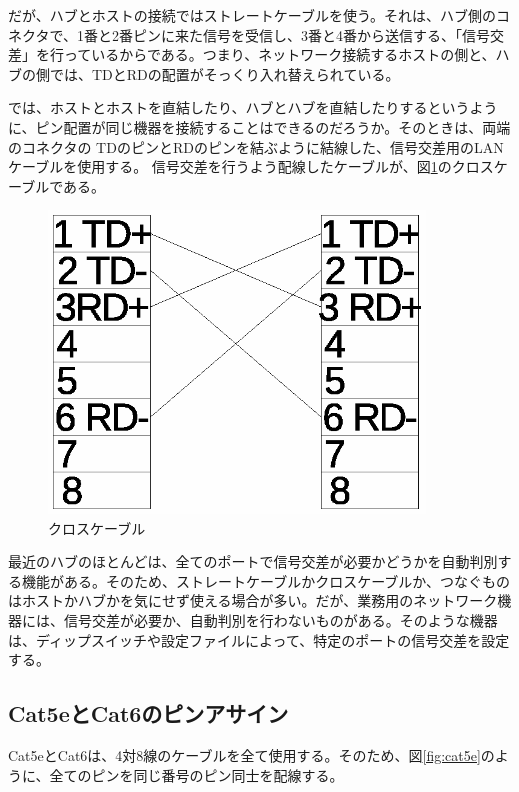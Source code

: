 だが、ハブとホストの接続ではストレートケーブルを使う。それは、ハブ側のコネクタで、1番と2番ピンに来た信号を受信し、3番と4番から送信する、「信号交差」を行っているからである。つまり、ネットワーク接続するホストの側と、ハブの側では、TDとRDの配置がそっくり入れ替えられている。

では、ホストとホストを直結したり、ハブとハブを直結したりするというように、ピン配置が同じ機器を接続することはできるのだろうか。そのときは、両端のコネクタの TDのピンとRDのピンを結ぶように結線した、信号交差用のLANケーブルを使用する。
信号交差を行うよう配線したケーブルが、図\ref{fig:cross}のクロスケーブルである。

\begin{figure}[htbp]
	\includegraphics[width=10cm,clip]{draw/cat5cross.eps}
	\caption{クロスケーブル}
	\label{fig:cross}
\end{figure}


最近のハブのほとんどは、全てのポートで信号交差が必要かどうかを自動判別する機能がある。そのため、ストレートケーブルかクロスケーブルか、つなぐものはホストかハブかを気にせず使える場合が多い。だが、業務用のネットワーク機器には、信号交差が必要か、自動判別を行わないものがある。そのような機器は、ディップスイッチや設定ファイルによって、特定のポートの信号交差を設定する。

\subsection{Cat5eとCat6のピンアサイン}
Cat5eとCat6は、4対8線のケーブルを全て使用する。そのため、図\ref{fig:cat5e}のように、全てのピンを同じ番号のピン同士を配線する。

